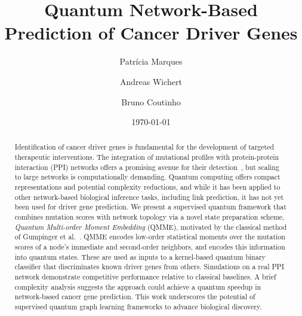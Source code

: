 \documentclass[
  reprint,
  superscriptaddress,
  amsmath,amssymb,
  aps,prl,
]{revtex4-2}
\begin{document}

\title{\textbf{Quantum Network-Based Prediction of Cancer Driver Genes}}%

\author{Patrícia Marques}

\author{Andreas Wichert}

\author{Bruno Coutinho}

\date{\today}

\begin{abstract} %

Identification of cancer driver genes is fundamental for the development of targeted therapeutic interventions. The integration of mutational profiles with protein-protein interaction (PPI) networks offers a promising avenue for their detection~\cite{horn2018netsig, nourbakhsh2024prediction},
but scaling to large networks is computationally demanding. Quantum computing offers compact representations and potential complexity reductions, and while it has been applied to other network-based biological inference tasks, including link prediction, it has not yet been used for driver gene prediction.
We present a supervised quantum framework %
that combines mutation scores with network topology via a novel state preparation scheme, \textit{Quantum Multi-order Moment Embedding} (QMME), motivated by the classical method of Gumpinger et al.~\cite{gumpinger2020prediction}. QMME encodes low-order statistical moments over the mutation scores of a node’s immediate and second-order neighbors, and encodes this information into quantum states. These are used as inputs to a kernel-based quantum binary classifier that discriminates known driver genes from others. 
Simulations on a real PPI network demonstrate competitive performance relative to classical baselines. A brief complexity analysis suggests the approach could achieve a quantum speedup in network-based cancer gene prediction. 
This work underscores the potential of supervised quantum graph learning frameworks to advance biological discovery. %


\end{abstract}
\end{document}
